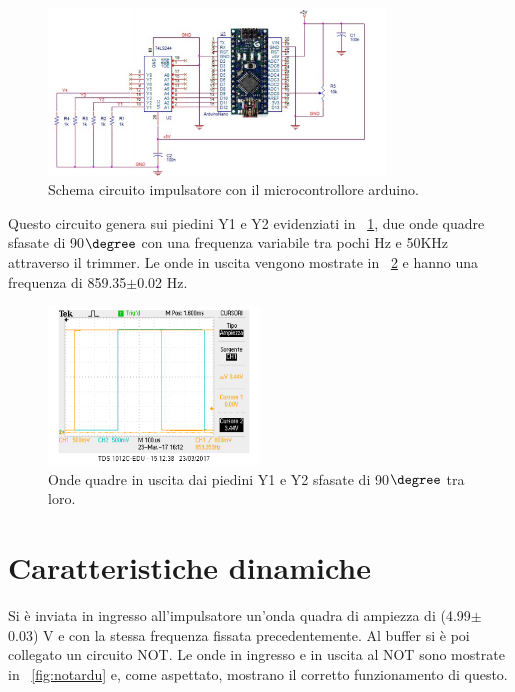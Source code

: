 \documentclass[a4paper,10pt]{article}
\begin{document}
{\begin{figure}[H]
	\centering
	\includegraphics[width=0.8\textwidth]{../grafici/schardu.png}
	\caption{Schema circuito impulsatore con il microcontrollore arduino.}
	\label{fig:schardu}
\end{figure}

Questo circuito genera sui piedini Y1 e Y2 evidenziati in \figurename{~\ref{fig:schardu}}, due onde quadre sfasate di 90$\degree$ con una frequenza variabile tra pochi Hz e 50KHz attraverso il trimmer. Le onde in uscita vengono mostrate in \figurename{~\ref{fig:ardu}} e hanno una frequenza di 859.35$\pm$0.02 Hz.

\begin{figure}[H]
	\centering
	\includegraphics[width=0.5\textwidth]{../grafici/ardu.png}
	\caption{Onde quadre in uscita dai piedini Y1 e Y2 sfasate di 90$\degree$ tra loro.}
	\label{fig:ardu}
\end{figure}


\section{Caratteristiche dinamiche}
Si è inviata in ingresso all'impulsatore un’onda quadra di ampiezza di (4.99$\pm$0.03) V e con la stessa frequenza fissata precedentemente. Al buffer si è poi collegato un circuito NOT. Le onde in ingresso e in uscita al NOT sono mostrate in \figurename{~\ref{fig:notardu}} e, come aspettato, mostrano il corretto funzionamento di questo.

}
\end{document}
